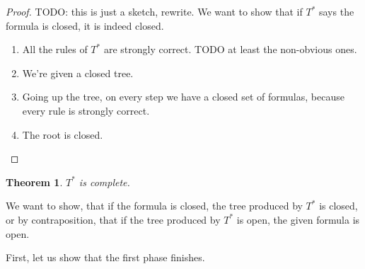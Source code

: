 \documentclass{article}
\newtheorem{theorem}{Theorem}
\theoremstyle{definition}
\newcommand*{\Ts}{T^*}
\begin{document}
\begin{proof}
    TODO: this is just a sketch, rewrite. We want to show that if $\Ts$ says the formula is closed, it is indeed closed.
    \begin{enumerate}
        \item All the rules of $\Ts$ are strongly correct. TODO at least the non-obvious ones.
        \item We're given a closed tree.
        \item Going up the tree, on every step we have a closed set of formulas, because every rule is strongly correct.
        \item The root is closed.
    \end{enumerate}
\end{proof}

\begin{theorem}
    $\Ts$ is complete.
\end{theorem}

We want to show, that if the formula is closed, the tree produced by $\Ts$ is closed, or by contraposition, that if the tree produced by $\Ts$ is open, the given formula is open.


First, let us show that the first phase finishes.
\end{document}
